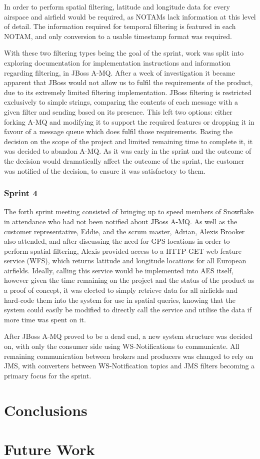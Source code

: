 \documentclass[a4paper, 12pt]{article}
\begin{document}
In order to perform spatial filtering, latitude and longitude data for every airspace and airfield would be required, as NOTAMs lack information at this level of detail. The information required for temporal filtering is featured in each NOTAM, and only conversion to a usable timestamp format was required.

With these two filtering types being the goal of the sprint, work was split into exploring documentation for implementation instructions and information regarding filtering, in JBoss A-MQ. After a week of investigation it became apparent that JBoss would not allow us to fulfil the requirements of the product, due to its extremely limited filtering implementation. JBoss filtering is restricted exclusively to simple strings, comparing the contents of each message with a given filter and sending based on its presence. This left two options: either forking A-MQ and modifying it to support the required features or dropping it in favour of a message queue which does fulfil those requirements. Basing the decision on the scope of the project and limited remaining time to complete it, it was decided to abandon A-MQ. As it was early in the sprint and the outcome of the decision would dramatically affect the outcome of the sprint, the customer was notified of the decision, to ensure it was satisfactory to them.

\subsubsection{Sprint 4}

The forth sprint meeting consisted of bringing up to speed members of Snowflake in attendance who had not been notified about JBoss A-MQ. As well as the customer representative, Eddie, and the scrum master, Adrian, Alexis Brooker also attended, and after discussing the need for GPS locations in order to perform spatial filtering, Alexis provided access to a HTTP-GET web feature service (WFS), which returns latitude and longitude locations for all European airfields. Ideally, calling this service would be implemented into AES itself, however given the time remaining on the project and the status of the product as a proof of concept, it was elected to simply retrieve data for all airfields and hard-code them into the system for use in spatial queries, knowing that the system could easily be modified to directly call the service and utilise the data if more time was spent on it.

After JBoss A-MQ proved to be a dead end, a new system structure was decided on, with only the consumer side using WS-Notifications to communicate. All remaining communication between brokers and producers was changed to rely on JMS, with converters between WS-Notification topics and JMS filters becoming a primary focus for the sprint. 

\section{Conclusions}
\label{sec:conclusions}

\newpage

\section{Future Work}

\newpage

\sloppy
\printbibliography
\end{document}
